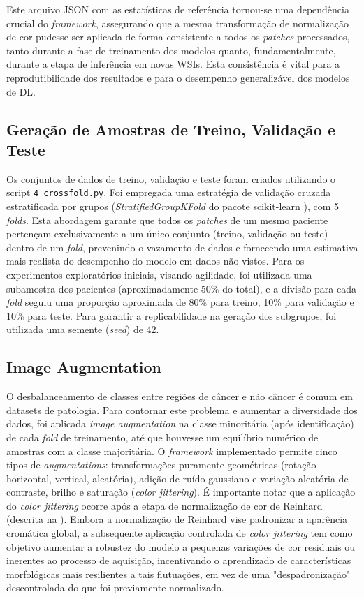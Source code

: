 Este arquivo JSON com as estatísticas de referência tornou-se uma dependência crucial do \textit{framework}, assegurando que a mesma transformação de normalização de cor pudesse ser aplicada de forma consistente a todos os \textit{patches} processados, tanto durante a fase de treinamento dos modelos quanto, fundamentalmente, durante a etapa de inferência em novas WSIs. Esta consistência é vital para a reprodutibilidade dos resultados e para o desempenho generalizável dos modelos de DL.

\subsection{Geração de Amostras de Treino, Validação e Teste}\label{subsec:met_geracao_amostras}
Os conjuntos de dados de treino, validação e teste foram criados utilizando o script \texttt{4\_crossfold.py}. Foi empregada uma estratégia de validação cruzada estratificada por grupos (\textit{StratifiedGroupKFold} do pacote scikit-learn \cite{Pedregosa2011}), com 5 \textit{folds}. Esta abordagem garante que todos os \textit{patches} de um mesmo paciente pertençam exclusivamente a um único conjunto (treino, validação ou teste) dentro de um \textit{fold}, prevenindo o vazamento de dados e fornecendo uma estimativa mais realista do desempenho do modelo em dados não vistos. Para os experimentos exploratórios iniciais, visando agilidade, foi utilizada uma subamostra dos pacientes (aproximadamente 50\% do total), e a divisão para cada \textit{fold} seguiu uma proporção aproximada de 80\% para treino, 10\% para validação e 10\% para teste. Para garantir a replicabilidade na geração dos subgrupos, foi utilizada uma semente (\textit{seed}) de 42.

\subsection{Image Augmentation}\label{sec:metodologia_augmentation} 
O desbalanceamento de classes entre regiões de câncer e não câncer é comum em datasets de patologia. Para contornar este problema e aumentar a diversidade dos dados, foi aplicada \textit{image augmentation} na classe minoritária (após identificação) de cada \textit{fold} de treinamento, até que houvesse um equilíbrio numérico de amostras com a classe majoritária. O \textit{framework} implementado permite cinco tipos de \textit{augmentations}: transformações puramente geométricas (rotação horizontal, vertical, aleatória), adição de ruído gaussiano e variação aleatória de contraste, brilho e saturação (\textit{color jittering}). É importante notar que a aplicação do \textit{color jittering} ocorre após a etapa de normalização de cor de Reinhard (descrita na ). Embora a normalização de Reinhard vise padronizar a aparência cromática global, a subsequente aplicação controlada de \textit{color jittering} tem como objetivo aumentar a robustez do modelo a pequenas variações de cor residuais ou inerentes ao processo de aquisição, incentivando o aprendizado de características morfológicas mais resilientes a tais flutuações, em vez de uma "despadronização" descontrolada do que foi previamente normalizado.

